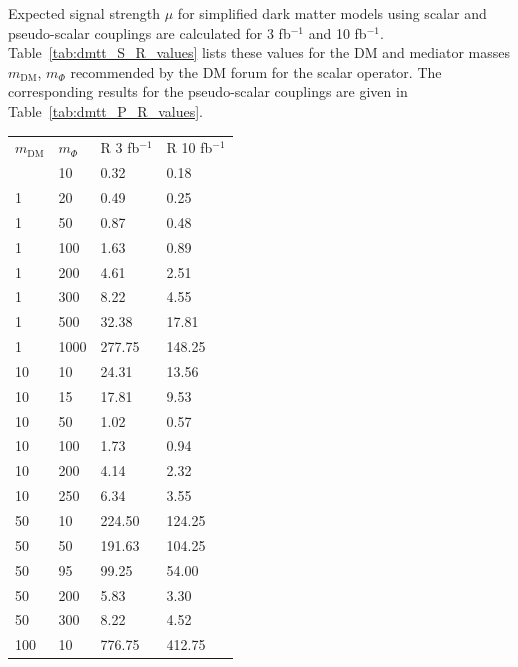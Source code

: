 Expected signal strength $\mu$ for simplified dark matter models using scalar and pseudo-scalar couplings are calculated for 3 fb$^{-1 }$ and 10 fb$^{-1 }$. Table~\ref{tab:dmtt_S_R_values} lists these
values for the DM and mediator masses $m_\textrm{DM}$, $m_\Phi$ recommended by the DM forum for the scalar operator. The corresponding results for the pseudo-scalar couplings are given in Table~\ref{tab:dmtt_P_R_values}. 

\begin{table}
  \small
  \centering
\begin{minipage}{.45\textwidth}{
  \begin{tabular}{llll}
    \hline                      
    $m_\textrm{DM}$ & $m_\Phi$  & R 3 fb$^{-1}$ & R 10 fb$^{-1}$ \\ \hlin
    1       & 10      & 0.32    & 0.18 \\ \hline
    1       & 20      & 0.49    & 0.25 \\ \hline
    1       & 50      & 0.87    & 0.48 \\ \hline
    1       & 100     & 1.63    & 0.89 \\ \hline
    1       & 200     & 4.61    & 2.51 \\ \hline
    1       & 300     & 8.22    & 4.55 \\ \hline
    1       & 500     & 32.38   & 17.81 \\ \hline
    1       & 1000    & 277.75  & 148.25 \\ \hline
    10      & 10      & 24.31   & 13.56 \\ \hline
    10      & 15      & 17.81   & 9.53 \\ \hline
    10      & 50      & 1.02    & 0.57 \\ \hline
    10      & 100     & 1.73    & 0.94 \\ \hline
    10      & 200     & 4.14    & 2.32 \\ \hline
    10      & 250     & 6.34    & 3.55 \\ \hline
    50      & 10      & 224.50  & 124.25 \\ \hline
    50      & 50      & 191.63  & 104.25 \\ \hline
    50      & 95      & 99.25   & 54.00 \\ \hline
    50      & 200     & 5.83    & 3.30 \\ \hline
    50      & 300     & 8.22    & 4.52 \\ \hline
    100     & 10      & 776.75  & 412.75 \\ \hline

\end{tabular}}
\end{minipage}
\end{table}
